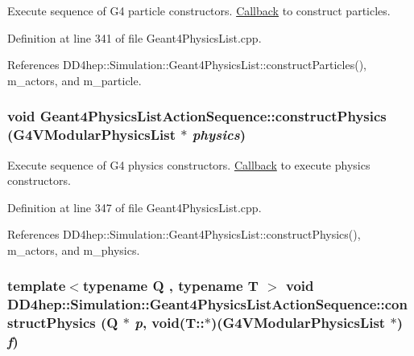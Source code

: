 Execute sequence of G4 particle constructors. \hyperlink{class_d_d4hep_1_1_callback}{Callback} to construct particles. 

Definition at line 341 of file Geant4PhysicsList.cpp.

References DD4hep::Simulation::Geant4PhysicsList::constructParticles(), m\_\-actors, and m\_\-particle.\hypertarget{class_d_d4hep_1_1_simulation_1_1_geant4_physics_list_action_sequence_a6f06380a0f50652f86d496ec5ab46005}{
\subsubsection[{constructPhysics}]{\setlength{\rightskip}{0pt plus 5cm}void Geant4PhysicsListActionSequence::constructPhysics (G4VModularPhysicsList $\ast$ {\em physics})}}
\label{class_d_d4hep_1_1_simulation_1_1_geant4_physics_list_action_sequence_a6f06380a0f50652f86d496ec5ab46005}


Execute sequence of G4 physics constructors. \hyperlink{class_d_d4hep_1_1_callback}{Callback} to execute physics constructors. 

Definition at line 347 of file Geant4PhysicsList.cpp.

References DD4hep::Simulation::Geant4PhysicsList::constructPhysics(), m\_\-actors, and m\_\-physics.\hypertarget{class_d_d4hep_1_1_simulation_1_1_geant4_physics_list_action_sequence_a1ff8b7577fa7eb3acb26393328d8dad4}{
\subsubsection[{constructPhysics}]{\setlength{\rightskip}{0pt plus 5cm}template$<$typename Q , typename T $>$ void DD4hep::Simulation::Geant4PhysicsListActionSequence::constructPhysics (Q $\ast$ {\em p}, \/  void(T::$\ast$)(G4VModularPhysicsList $\ast$) {\em f})}}
\label{class_d_d4hep_1_1_simulation_1_1_geant4_physics_list_action_sequence_a1ff8b7577fa7eb3acb26393328d8dad4}


